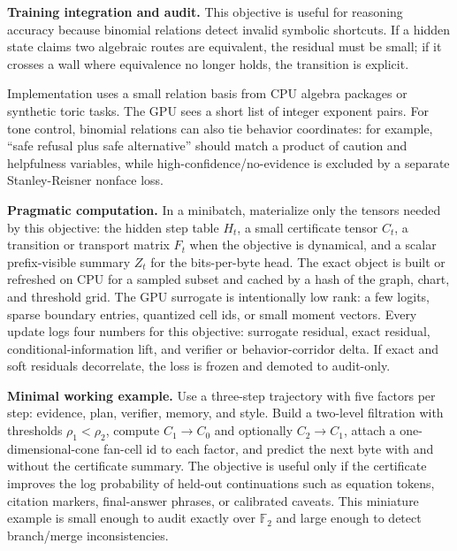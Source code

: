 \documentclass[10pt]{article}
\newcommand{\FF}{\mathbb{F}}
\numberwithin{equation}{section}
\begin{document}
\noindent\textbf{Training integration and audit.} This objective is useful for reasoning accuracy because binomial relations detect invalid symbolic shortcuts. If a hidden state claims two algebraic routes are equivalent, the residual must be small; if it crosses a wall where equivalence no longer holds, the transition is explicit.

Implementation uses a small relation basis from CPU algebra packages or synthetic toric tasks. The GPU sees a short list of integer exponent pairs. For tone control, binomial relations can also tie behavior coordinates: for example, ``safe refusal plus safe alternative'' should match a product of caution and helpfulness variables, while high-confidence/no-evidence is excluded by a separate Stanley-Reisner nonface loss.

\noindent\textbf{Pragmatic computation.} In a minibatch, materialize only the tensors needed by this objective: the hidden step table $H_t$, a small certificate tensor $C_t$, a transition or transport matrix $F_t$ when the objective is dynamical, and a scalar prefix-visible summary $Z_t$ for the bits-per-byte head. The exact object is built or refreshed on CPU for a sampled subset and cached by a hash of the graph, chart, and threshold grid. The GPU surrogate is intentionally low rank: a few logits, sparse boundary entries, quantized cell ids, or small moment vectors. Every update logs four numbers for this objective: surrogate residual, exact residual, conditional-information lift, and verifier or behavior-corridor delta. If exact and soft residuals decorrelate, the loss is frozen and demoted to audit-only.

\noindent\textbf{Minimal working example.} Use a three-step trajectory with five factors per step: evidence, plan, verifier, memory, and style. Build a two-level filtration with thresholds $\rho_1<\rho_2$, compute $C_1\to C_0$ and optionally $C_2\to C_1$, attach a one-dimensional-cone fan-cell id to each factor, and predict the next byte with and without the certificate summary. The objective is useful only if the certificate improves the log probability of held-out continuations such as equation tokens, citation markers, final-answer phrases, or calibrated caveats. This miniature example is small enough to audit exactly over $\FF_2$ and large enough to detect branch/merge inconsistencies.
\end{document}
